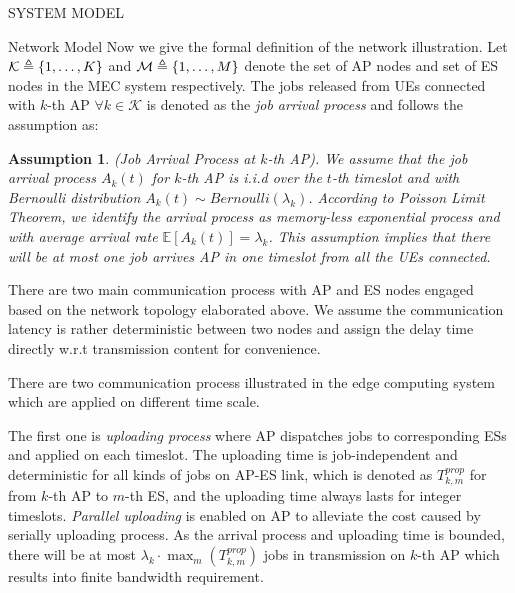 \documentclass[10pt, conference, letterpaper]{IEEEtran}
\newtheorem{assumption}{Assumption}
\DeclarePairedDelimiter{\set}{\{}{\}}
\newcommand{\apSet}{\mathcal{K}}
\begin{document}
\begin{section}{SYSTEM MODEL}
\begin{subsection}{Network Model}
            Now we give the formal definition of the network illustration. Let $\mathcal{K} \triangleq \set{1,\dots,K}$ and $\mathcal{M} \triangleq \set{1,\dots,M}$ denote the set of AP nodes and set of ES nodes in the MEC system respectively. The jobs released from UEs connected with $k$-th AP $\forall k\in\apSet$ is denoted as the \emph{job arrival process} and follows the assumption as:
            \begin{assumption}
                (Job Arrival Process at $k$-th AP).
                We assume that the job arrival process $A_k(t)$ for $k$-th AP is i.i.d over the $t$-th timeslot and with Bernoulli distribution $A_k(t) \sim Bernoulli(\lambda_k)$.  According to Poisson Limit Theorem, we identify the arrival process as memory-less exponential process and with average arrival rate $\mathbb{E}[A_k(t)] = \lambda_k$.
                This assumption implies that there will be at most one job arrives AP in one timeslot from all the UEs connected.
            \end{assumption}

            There are two main communication process with AP and ES nodes engaged based on the network topology elaborated above. We assume the communication latency is rather deterministic between two nodes and assign the delay time directly w.r.t transmission content for convenience.

            There are two communication process illustrated in the edge computing system which are applied on different time scale.
            
            The first one is \emph{uploading process} where AP dispatches jobs to corresponding ESs and applied on each timeslot. The uploading time is {\color{red}job-independent} and deterministic for all kinds of jobs on AP-ES link, which is denoted as $T^{prop}_{k,m}$ for from $k$-th AP to $m$-th ES, and the uploading time always lasts for integer timeslots. \emph{Parallel uploading} is enabled on AP to alleviate the cost caused by serially uploading process. As the arrival process and uploading time is bounded, there will be at most $\lambda_k \cdot \max_m(T^{prop}_{k,m})$ jobs in transmission on $k$-th AP which results into finite bandwidth requirement.
            

\end{subsection}
\end{section}
\end{document}
